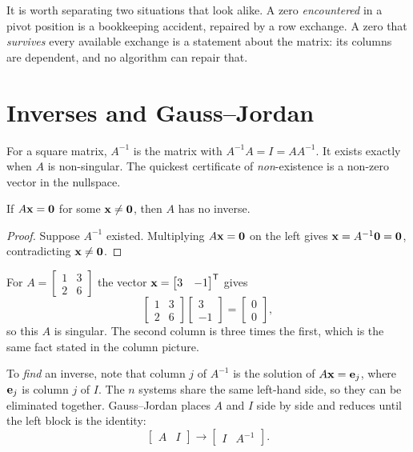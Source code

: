 \begin{remark}
It is worth separating two situations that look alike. A zero \emph{encountered}
in a pivot position is a bookkeeping accident, repaired by a row exchange. A
zero that \emph{survives} every available exchange is a statement about the
matrix: its columns are dependent, and no algorithm can repair that.
\end{remark}

\section{Inverses and Gauss--Jordan}

For a square matrix, \(A^{-1}\) is the matrix with \(A^{-1}A=I=AA^{-1}\). It
exists exactly when \(A\) is non-singular. The quickest certificate of
\emph{non}-existence is a non-zero vector in the nullspace.

\begin{proposition}
If \(A\mathbf{x}=\mathbf{0}\) for some \(\mathbf{x}\neq\mathbf{0}\), then \(A\) has no
inverse.
\end{proposition}

\begin{proof}
Suppose \(A^{-1}\) existed. Multiplying \(A\mathbf{x}=\mathbf{0}\) on the left gives
\(\mathbf{x}=A^{-1}\mathbf{0}=\mathbf{0}\), contradicting \(\mathbf{x}\neq\mathbf{0}\).
\end{proof}

\begin{example}
For \(A=\begin{bmatrix}1&3\\2&6\end{bmatrix}\) the vector
\(\mathbf{x}=\begin{bmatrix}3&-1\end{bmatrix}^{\mathsf{T}}\) gives
\[
	\begin{bmatrix}1&3\\2&6\end{bmatrix}\begin{bmatrix}3\\-1\end{bmatrix}
	=\begin{bmatrix}0\\0\end{bmatrix},
\]
so this \(A\) is singular. The second column is three times the first, which is
the same fact stated in the column picture.
\end{example}

To \emph{find} an inverse, note that column \(j\) of \(A^{-1}\) is the solution
of \(A\mathbf{x}=\mathbf{e}_j\), where \(\mathbf{e}_j\) is column \(j\) of \(I\). The
\(n\) systems share the same left-hand side, so they can be eliminated together.
Gauss--Jordan places \(A\) and \(I\) side by side and reduces until the left
block is the identity:
\[
	\begin{bmatrix}A&I\end{bmatrix}\longrightarrow\begin{bmatrix}I&A^{-1}\end{bmatrix}.
\]

